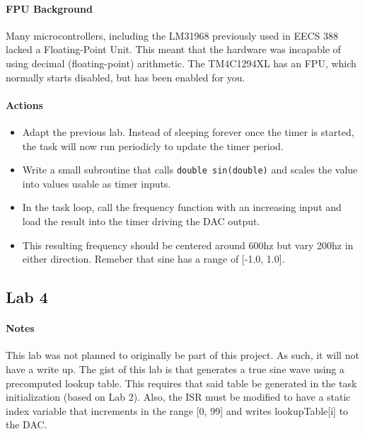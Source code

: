 \documentclass[titlepage]{article}
\begin{document}
\paragraph{FPU Background}
Many microcontrollers, including the LM31968 previously used in EECS 388 lacked a Floating-Point Unit. This meant 
that the hardware was incapable of using decimal (floating-point) arithmetic. The TM4C1294XL has an FPU, which normally
starts disabled, but has been enabled for you.

\paragraph{Actions}
\begin{itemize}
    \item Adapt the previous lab. Instead of sleeping forever once the timer is started, the task will 
    now run periodicly to update the timer period.
    \item Write a small subroutine that calls \texttt{double sin(double)} and scales the value into values usable as 
    timer inputs.
    \item In the task loop, call the frequency function with an increasing input and load the result into the 
    timer driving the DAC output.
    \item This resulting frequency should be centered around 600hz but vary 200hz in either direction. Remeber
    that sine has a range of [-1.0, 1.0].
\end{itemize}
\pagebreak
\subsection{Lab 4}
\paragraph{Notes}
This lab was not planned to originally be part of this project. As such, it will not have a write up. The gist of this 
lab is that generates a true sine wave using a precomputed lookup table. This requires that said table be generated in the 
task initialization (based on Lab 2). Also, the ISR must be modified to have a static index variable that increments in the range [0, 99] 
and writes lookupTable[i] to the DAC.
\end{document}
